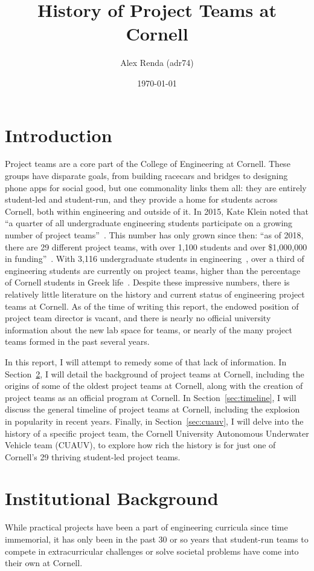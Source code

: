 \documentclass[12pt]{article}
\title{History of Project Teams at Cornell}
\author{Alex Renda (adr74)}
\date{\monthyeardate\today}
\begin{document}
\maketitle

\section{Introduction}

Project teams are a core part of the College of Engineering at Cornell.
These groups have disparate goals, from building racecars and bridges to designing phone apps for social good, but one commonality links them all: they are entirely student-led and student-run, and they provide a home for students across Cornell, both within engineering and outside of it.
In 2015, Kate Klein noted that ``a quarter of all undergraduate engineering students participate on a growing number of project teams''~\cite{klein_engineering_2015}.
This number has only grown since then:
``as of 2018, there are 29 different project teams, with over 1,100 students and over \$1,000,000 in funding''~\cite{noauthor_project_2018}.
With 3,116 undergraduate students in engineering~\cite{westervelt_key_2017}, over a third of engineering students are currently on project teams, higher than the percentage of Cornell students in Greek life~\cite{noauthor_sorority_2017}.
Despite these impressive numbers, there is relatively little literature on the history and current status of engineering project teams at Cornell.
As of the time of writing this report, the endowed position of project team director is vacant, and there is nearly no official university information about the new lab space for teams, or nearly of the many project teams formed in the past several years.

In this report, I will attempt to remedy some of that lack of information.
In Section~\ref{sec:background}, I will detail the background of project teams at Cornell, including the origins of some of the oldest project teams at Cornell, along with the creation of project teams as an official program at Cornell.
In Section~\ref{sec:timeline}, I will discuss the general timeline of project teams at Cornell, including the explosion in popularity in recent years.
Finally, in Section~\ref{sec:cuauv}, I will delve into the history of a specific project team, the Cornell University Autonomous Underwater Vehicle team (CUAUV), to explore how rich the history is for just one of Cornell's 29 thriving student-led project teams.

\section{Institutional Background}
\label{sec:background}
While practical projects have been a part of engineering curricula since time immemorial, it has only been in the past 30 or so years that student-run teams to compete in extracurricular challenges or solve societal problems have come into their own at Cornell.
\end{document}
